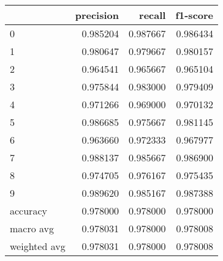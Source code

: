 \begin{tabular}{lrrr}
\toprule
 & precision & recall & f1-score \\
\midrule
0 & 0.985204 & 0.987667 & 0.986434 \\
1 & 0.980647 & 0.979667 & 0.980157 \\
2 & 0.964541 & 0.965667 & 0.965104 \\
3 & 0.975844 & 0.983000 & 0.979409 \\
4 & 0.971266 & 0.969000 & 0.970132 \\
5 & 0.986685 & 0.975667 & 0.981145 \\
6 & 0.963660 & 0.972333 & 0.967977 \\
7 & 0.988137 & 0.985667 & 0.986900 \\
8 & 0.974705 & 0.976167 & 0.975435 \\
9 & 0.989620 & 0.985167 & 0.987388 \\
accuracy & 0.978000 & 0.978000 & 0.978000 \\
macro avg & 0.978031 & 0.978000 & 0.978008 \\
weighted avg & 0.978031 & 0.978000 & 0.978008 \\
\bottomrule
\end{tabular}
